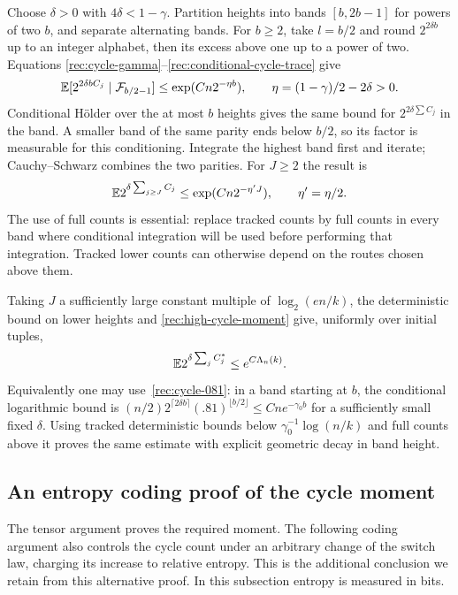 Choose $\delta>0$ with $4\delta<1-\gamma$.  Partition heights into
bands $[b,2b-1]$ for powers of two $b$, and separate alternating bands.
For $b\ge2$, take $l=b/2$ and round $2^{2\delta b}$ up to an integer
alphabet, then its excess above one up to a power of two.  Equations
\eqref{rec:cycle-gamma}--\eqref{rec:conditional-cycle-trace} give
\[
 \mathbb E[2^{2\delta bC_j}\mid\mathcal F_{b/2-1}]
 \le\exp(Cn2^{-\eta b}),\qquad
 \eta=(1-\gamma)/2-2\delta>0.
\]
Conditional H\"older over the at most $b$ heights gives the same bound
for $2^{2\delta\sum C_j}$ in the band.  A smaller band of the same
parity ends below $b/2$, so its factor is measurable for this conditioning.
Integrate the highest band first and iterate; Cauchy--Schwarz combines
the two parities.  For $J\ge2$ the result is
\begin{equation}\label{rec:high-cycle-moment}
 \mathbb E2^{\delta\sum_{j\ge J}C_j}
       \le\exp(Cn2^{-\eta'J}),\qquad \eta'=\eta/2.
\end{equation}
The use of full counts is essential: replace tracked counts by full
counts in every band where conditional integration will be used before
performing that integration.  Tracked lower counts can otherwise depend
on the routes chosen above them.

Taking $J$ a sufficiently large constant multiple of $\log_2(en/k)$,
the deterministic bound on lower heights and
\eqref{rec:high-cycle-moment} give, uniformly over initial tuples,
\begin{equation}\label{rec:tracked-cycle-moment}
 \mathbb E2^{\delta\sum_jC_j^*}\le e^{C\Lambda_n(k)}.
\end{equation}
Equivalently one may use~\eqref{rec:cycle-081}: in a band starting at
$b$, the conditional logarithmic bound is
$(n/2)2^{\lceil2\delta b\rceil}(.81)^{\lfloor b/2\rfloor}
\le Cn e^{-\gamma_0b}$ for a sufficiently small fixed $\delta$.
Using tracked deterministic bounds below
$\gamma_0^{-1}\log(n/k)$ and full counts above it proves the same
estimate with explicit geometric decay in band height.

\subsection{An entropy coding proof of the cycle moment}
The tensor argument proves the required moment.  The following coding
argument also controls the cycle count under an arbitrary change of
the switch law, charging its increase to relative entropy.  This is
the additional conclusion we retain from this alternative proof.
In this subsection entropy is measured in bits.

